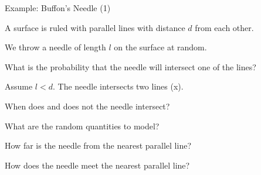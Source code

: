 \begin{frame}{Example: Buffon's Needle (1)}

\plitemsep 0.03in
\bci

\item<1-> A surface is ruled with parallel lines with distance $d$ from
  each other.
\item<1-> We throw a needle of length $l$ on the surface at random.
\item<2-> \question What is the probability that the needle will intersect
  one of the lines?
\medskip

  {
    \bci
  \item<3->  Assume $l <d$. The needle intersects two lines (x).
  \item<4-> When does and does not the needle intersect?
  \item<5-> What are the random quantities to model? 
    \bci
  \item<6->[R1.] How far is the needle from the nearest parallel line?

    \smallskip


  \item<7->[R2.] How does the needle meet the nearest parallel line?

    \smallskip

      \eci
    \eci
  }
  {
  }
  
\eci

\end{frame}



